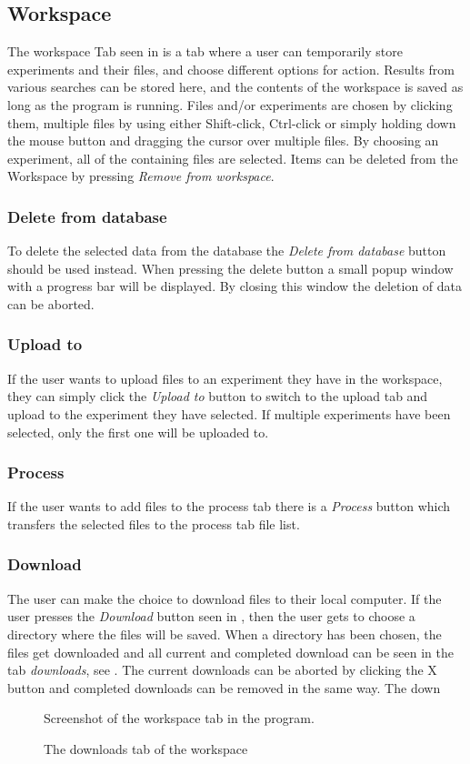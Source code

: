 \subsection{Workspace} \label{sec:des_workspace}
The workspace Tab seen in  is a tab where a user can temporarily store experiments and their files, and choose different options for action. Results from various searches can be stored here, and the contents of the workspace is saved as long as the program is running. Files and/or experiments are chosen by clicking them, multiple files by using either Shift-click, Ctrl-click or simply holding down the mouse button and dragging the cursor over multiple files. By choosing an experiment, all of the containing files are selected. Items can be deleted from the Workspace by pressing \emph{Remove from workspace}.
\subsubsection{Delete from database}
To delete the selected data from the database the \emph{Delete from database} button should be used instead. When pressing the delete button a small popup window with a progress bar will be displayed. By closing this window the deletion of data can be aborted.
\subsubsection{Upload to}
If the user wants to upload files to an experiment they have in the workspace, they can simply click the \emph{Upload to} button to switch to the upload tab and upload to the experiment they have selected. If multiple experiments have been selected, only the first one will be uploaded to.
\subsubsection{Process}
If the user wants to add files to the process tab there is a \emph{Process} button which transfers the selected files to the process tab file list.
\subsubsection{Download}
The user can make the choice to download files to their local computer. If the user presses the \emph{Download} button seen in , then the user gets to choose a directory where the files will be saved. When a directory has been chosen, the files get downloaded and all current and completed download can be seen in the tab \emph{downloads}, see . The current downloads can be aborted by clicking the X button and completed downloads can be removed in the same way. The down
\begin{figure}[htb]
	\caption{Screenshot of the workspace tab in the program.}
	\label{fig:des_workspace-view}
\end{figure}
\begin{figure}[htb]
	\caption{The downloads tab of the workspace}
	\label{fig:des_download-view}
\end{figure}
\FloatBarrier

